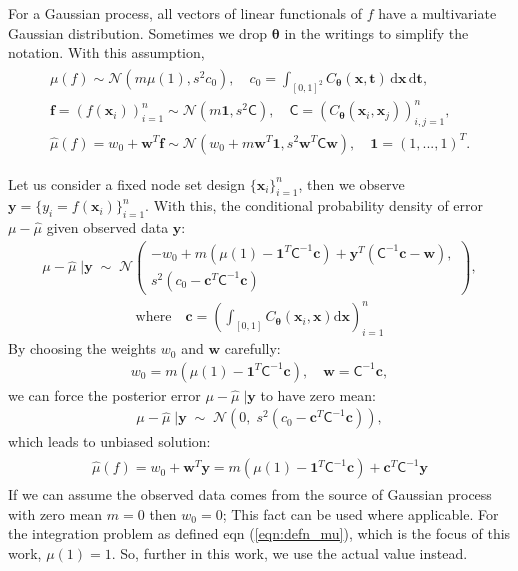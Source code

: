 \documentclass[smallextended]{svjour3}       %
\newcommand{\bm}[1]{\boldsymbol{#1}}
\newcommand{\dif}[1]{\text{d}{#1}}
\newcommand{\vtheta}{{\bm{\theta}}}
\newcommand{\vc}{\bm{c}}
\newcommand{\vf}{\bm{f}}
\newcommand{\vt}{\bm{t}}
\newcommand{\vw}{\bm{w}}
\newcommand{\vx}{\bm{x}}
\newcommand{\vy}{\bm{y}}
\newcommand{\vone}{\bm{1}}
\newcommand{\mC}{\mathsf{C}}
\newcommand{\hmu}{\hat{\mu}}
\newenvironment{nalign}{
    \begin{equation}
    \begin{aligned}
}{
    \end{aligned}
    \end{equation}
    \ignorespacesafterend
}
\begin{document}
For a Gaussian process, all vectors of linear functionals of $f$ have a multivariate Gaussian distribution. Sometimes we drop $\vtheta$ in the writings to simplify the notation. With this assumption,
\begin{align*}
\label{eqn:kernel_integral_definitions}
\begin{array}{cc}
\mu(f) \sim \mathcal{N}(m \mu(1), s^2 c_0), 
\quad
c_0 = \int_{[0,1]^2} C_\vtheta(\vx,\vt) \, \dif{\vx} \, \dif{\vt},
\\
\vf  = \left( f(\vx_i)\right)_{i=1}^n \sim \mathcal{N}(m \vone, s^2 \mC), 
\quad
\mC = \left(  C_\vtheta(\vx_i,\vx_j)  \right)_{i,j=1}^n,
\\
\hmu(f) = w_0 + \vw^T \vf \sim \mathcal{N} (w_0 + m \vw^T \vone, s^2 \vw^T \mC \vw),
\quad
\vone = \left(1,...,1 \right)^T.
\end{array}
\end{align*}

Let us consider a fixed node set design $\{ \vx_i \}_{i=1}^n$, then we observe $\vy = \{y_i = f(\vx_i) \}_{i=1}^n$. With this, the conditional probability density of error $\mu-\hmu$ given observed data $\vy$:
\begin{nalign}
\mu-\hmu\;|\vy
\; \sim \; \mathcal{N} 
\left(
\begin{array}{cc}
-w_0 + m (\mu(1) - \vone^T  \mC^{-1}\vc )
+
\vy^T( \mC^{-1}\vc - \vw ),
\\
s^2 (c_0 - \vc^T\mC^{-1}\vc) 
\end{array}
\right),
\end{nalign}
\begin{align*}
\text{where} \quad 
\vc = \left( \int_{[0,1]} C_\vtheta(\vx_i,\vx) \dif{\vx} \right)_{i=1}^n
\end{align*}
By choosing the weights $w_0$ and $\vw$ carefully:
\begin{align*}
w_0 =  m (\mu(1) - \vone^T  \mC^{-1}\vc ),
\quad
\vw = \mC^{-1}\vc,
\end{align*}
we can force the posterior error $\mu-\hmu\;|\vy$ to have zero mean:
\begin{align*}
\label{eqn_error_cond_prob}
\mu-\hmu\;|\vy
\; \sim \; \mathcal{N} 
\left(
0, \;
s^2 (c_0 - \vc^T\mC^{-1}\vc) 
\right)
,
\end{align*}
which leads to unbiased solution:
\begin{align*}
\begin{array}{cc}
\hmu(f) = w_0 + \vw^T \vy = 
m(\mu(1) - \vone^T  \mC^{-1}\vc )
+
\vc^T \mC^{-1} \vy
\end{array}
\end{align*}
If we can assume the observed data comes from the source of Gaussian process with zero mean $m=0$ then $w_0 = 0$; This fact can be used where applicable. For the integration problem as defined eqn (\ref{eqn:defn_mu}), which is the focus of this work, $\mu(1) = 1$. So, further in this work, we use the actual value instead.
\end{document}
